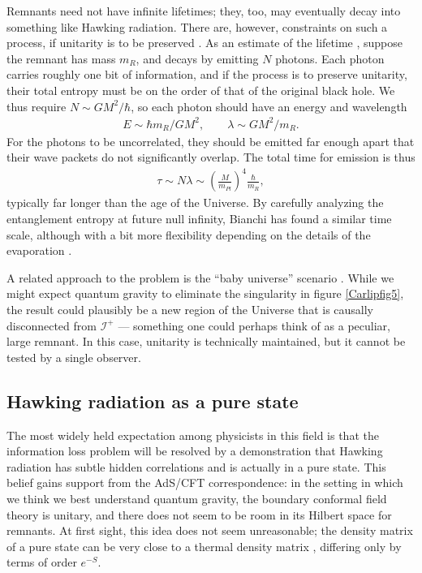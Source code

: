 \documentclass[11pt]{article}
\begin{document}
Remnants need not have infinite lifetimes; they, too, may
eventually decay into something like Hawking radiation.  There
are, however,  constraints on such a process, if
unitarity is to be preserved \cite{Aharanov,Carlitz}.  As an
estimate of the lifetime \cite{Giddingsy}, suppose the remnant 
has mass $m_R$, and decays by emitting $N$ photons.  Each 
photon carries roughly one bit of information, and if the
process is to preserve unitarity, their total entropy must be
on the order of that of the original black hole.  We
thus require $N\sim GM^2/\hbar$, so each photon should have
an energy and wavelength
\begin{align*}
E \sim \hbar m_R/GM^2, \qquad \lambda \sim GM^2/m_R  .
\end{align*}
For the photons to be uncorrelated, they should be emitted far enough
apart that their wave packets do not significantly overlap.  The total 
time for emission is thus
\begin{align}
\tau \sim N\lambda \sim \left(\frac{M}{m_{Pl}}\right)^4\frac{\hbar}{m_R}  ,
\label{Carlipj2}
\end{align}
typically far longer than the age of the Universe.
By carefully analyzing the entanglement entropy at future null
infinity, Bianchi has found a similar time scale, although with a
bit more flexibility depending on the details of the evaporation
\cite{Bianchix}.

A related approach to the problem is the ``baby 
universe'' scenario \cite{Hawking_baby}.  While we might expect
quantum gravity to eliminate the singularity in figure \ref{Carlipfig5},
the result could plausibly be a new region of the Universe
that is causally disconnected from $\mathcal{I}^+$ --- something
one could perhaps think of as a peculiar, large remnant.  In this case,
unitarity is technically maintained, but it cannot be tested by a single
observer.   

\subsection{Hawking radiation as a pure state}

The most widely held expectation among physicists in this
field is that the information loss problem will be resolved by a
demonstration that Hawking radiation has subtle hidden correlations 
and is actually in a pure state.  This belief gains support from the
AdS/CFT correspondence: in the setting in which we think we best
understand quantum gravity, the boundary conformal field theory
is unitary, and there does not seem to be room in its Hilbert space
for remnants.  At first sight, this idea does not seem unreasonable; 
the density matrix of a pure state can be very close to a thermal 
density matrix \cite{Papadodimas}, differing only by terms of
order $e^{-S}$.  
\end{document}
